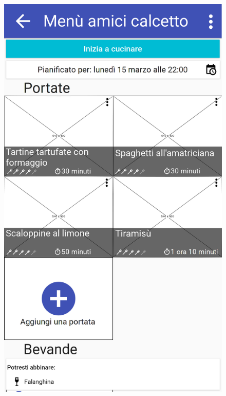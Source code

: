 \begin{figure}[H]
\begin{minipage}{.49\textwidth}
		\includegraphics[width=\textwidth]{img/wireframe/men_amici_calcetto_menu_contestuale_vino.png}
	\end{minipage}
\end{figure}

